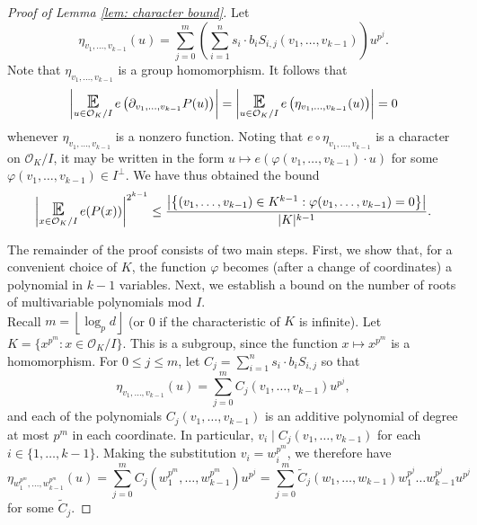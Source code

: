 \documentclass{amsart}
\theoremstyle{definition}
\numberwithin{equation}{section}
\newcommand{\mO}{\mathcal{O}}
\renewcommand{\tilde}{\widetilde}
\newcommand{\floor}[1]{\left\lfloor #1 \right\rfloor}
\DeclareMathOperator*{\E}{\text{\Large $\mathbb{E}$}}
\begin{document}
\begin{proof}[Proof of Lemma \ref{lem: character bound}]
	Let
	\begin{equation*}
		\eta_{v_1, \dots, v_{k-1}}(u) = \sum_{j=0}^m{\left( \sum_{i=1}^n{s_i \cdot b_i S_{i,j}(v_1, \dots, v_{k-1})} \right) u^{p^j}}.
	\end{equation*}
	Note that $\eta_{v_1, \dots, v_{k-1}}$ is a group homomorphism.
	It follows that
	\begin{equation*}
		\left| \E_{u \in \mO_K/I}{e \left( \partial_{v_1, \dots, v_{k-1}}P(u) \right)} \right|
		 = \left| \E_{u \in \mO_K/I}{e \left( \eta_{v_1, \dots, v_{k-1}}(u) \right)} \right|
		 = 0
	\end{equation*}
	whenever $\eta_{v_1, \dots, v_{k-1}}$ is a nonzero function.
	Noting that $e \circ \eta_{v_1, \dots, v_{k-1}}$ is a character on $\mO_K/I$, it may be written in the form $u \mapsto e \left( \varphi(v_1, \dots, v_{k-1}) \cdot u \right)$ for some $\varphi(v_1, \dots, v_{k-1}) \in I^{\perp}$.
	We have thus obtained the bound
	\begin{equation*}
		\left| \E_{x \in \mO_K/I}{e(P(x))} \right|^{2^{k-1}}
		 \le \frac{\left| \left\{ (v_1, \dots, v_{k-1}) \in K^{k-1} : \varphi(v_1, \dots, v_{k-1}) = 0 \right\} \right|}{|K|^{k-1}}.
	\end{equation*}
	
	The remainder of the proof consists of two main steps.
	First, we show that, for a convenient choice of $K$, the function $\varphi$ becomes (after a change of coordinates) a polynomial in $k-1$ variables.
	Next, we establish a bound on the number of roots of multivariable polynomials mod $I$. \\
	
	Recall $m = \floor{\log_p{d}}$ (or 0 if the characteristic of $K$ is infinite).
	Let $K = \{x^{p^m} : x \in \mO_K/I\}$.
	This is a subgroup, since the function $x \mapsto x^{p^m}$ is a homomorphism.
	For $0 \le j \le m$, let $C_j = \sum_{i=1}^n{s_i \cdot b_i S_{i,j}}$ so that
	\begin{equation*}
		\eta_{v_1, \dots, v_{k-1}}(u) = \sum_{j=0}^m{C_j(v_1, \dots, v_{k-1}) u^{p^j}},
	\end{equation*}
	and each of the polynomials $C_j(v_1, \dots, v_{k-1})$ is an additive polynomial of degree at most $p^m$ in each coordinate.
	In particular, $v_i \mid C_j(v_1, \dots, v_{k-1})$ for each $i \in \{1, \dots, k-1\}$.
	Making the substitution $v_i = w_i^{p^m}$, we therefore have
	\begin{equation*}
		\eta_{w_1^{p^m}, \dots, w_{k-1}^{p^m}}(u) = \sum_{j=0}^m{C_j \left( w_1^{p^m}, \dots, w_{k-1}^{p^m} \right) u^{p^j}}
		 = \sum_{j=0}^m{\tilde{C}_j \left( w_1, \dots, w_{k-1} \right) w_1^{p^j} \dots w_{k-1}^{p^j} u^{p^j}}
	\end{equation*}
	for some $\tilde{C}_j$.
	

\end{proof}
\end{document}
